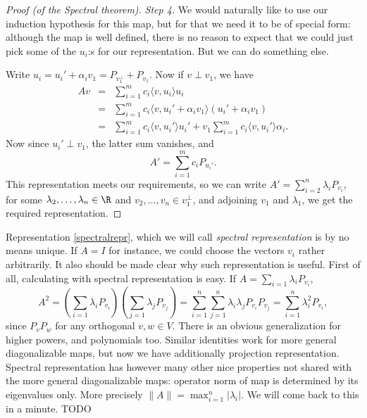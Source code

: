 \begin{proof}[Proof (of the Spectral theorem)]
	\textit{Step 4.} We would naturally like to use our induction hypothesis for this map, but for that we need it to be of special form: although the map is well defined, there is no reason to expect that we could just pick some of the $u_{i}$:s for our representation. But we can do something else.

	Write $u_{i} = u_{i}' + \alpha_{i} v_{1} = P_{v_{1}^{\perp}} + P_{v_{1}}$. Now if $v \perp v_{1}$, we have
	\begin{eqnarray*}
		A v &=& \sum_{i = 1}^{m} c_{i} \langle v, u_{i}\rangle u_{i} \\
		&=& \sum_{i = 1}^{m} c_{i} \langle v, u_{i}' + \alpha_{i} v_{1}\rangle (u_{i}' + \alpha_{i} v_{1}) \\
		&=& \sum_{i = 1}^{m} c_{i} \langle v, u_{i}'\rangle u_{i}' +  v_{1} \sum_{i = 1}^{m} c_{i} \langle v, u_{i}'\rangle \alpha_{i}.
	\end{eqnarray*}
	Now since $u_{i}' \perp v_{1}$, the latter sum vanishes, and
	\[
		A' = \sum_{i = 1}^{m} c_{i} P_{u_{i}'}.
	\]
	This representation meets our requirements, so we can write $A' = \sum_{i = 2}^{n} \lambda_{i} P_{v_{i}}$, for some $\lambda_{2}, \ldots, \lambda_{n} \in \R$ and $v_{2}, \ldots, v_{n} \in v_{1}^{\perp}$, and adjoining $v_{1}$ and $\lambda_{1}$, we get the required representation.
\end{proof}

Representation \ref{spectralrepr}, which we will call \textit{spectral representation} is by no means unique. If $A = I$ for instance, we could choose the vectors $v_{i}$ rather arbitrarily. It also should be made clear why such representation is useful. First of all, calculating with spectral representation is easy. If $A = \sum_{i = 1} \lambda_{i} P_{v_{i}}$,
\[
	A^{2} = \left(\sum_{i = 1} \lambda_{i} P_{v_{i}}\right) \left(\sum_{j = 1} \lambda_{j} P_{v_{j}}\right) = \sum_{i = 1}^{n} \sum_{j = 1}^{n}\lambda_{i} \lambda_{j} P_{v_{i}} P_{v_{j}} = \sum_{i = 1}^{n} \lambda_{i}^2 P_{v_{i}},
\]
since $P_{v}P_{w}$ for any orthogonal $v, w \in V$. There is an obvious generalization for higher powers, and polynomials too. Similar identities work for more general diagonalizable maps, but now we have additionally projection representation. Spectral representation has however many other nice properties not shared with the more general diagonalizable maps: operator norm of map is determined by its eigenvalues only. More precisely $\|A\| = \max_{i = 1}^{n} |\lambda_{i}|$. We will come back to this in a minute. TODO

